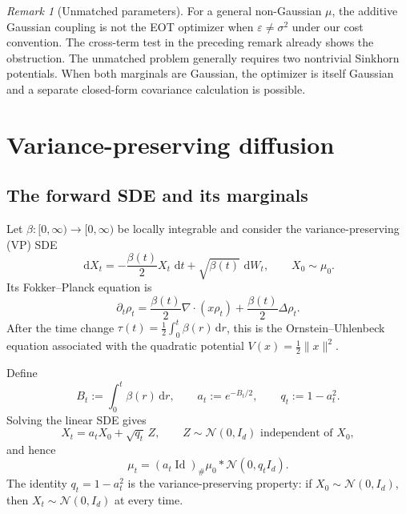 \documentclass[11pt]{article}
\theoremstyle{remark}
\newtheorem{remark}[theorem]{Remark}
\newcommand{\N}{\mathcal{N}}
\newcommand{\Id}{\operatorname{Id}}
\newcommand{\dd}{\,\mathrm{d}}
\newcommand{\push}{_{\#}}
\begin{document}
\begin{remark}[Unmatched parameters]
For a general non-Gaussian $\mu$, the additive Gaussian coupling is not the
EOT optimizer when $\varepsilon\ne\sigma^2$ under our cost convention.  The
cross-term test in the preceding remark already shows the obstruction.  The
unmatched problem generally requires two nontrivial Sinkhorn potentials.
When both marginals are Gaussian, the optimizer is itself Gaussian and a
separate closed-form covariance calculation is possible.
\end{remark}

\section{Variance-preserving diffusion}

\subsection{The forward SDE and its marginals}

Let $\beta:[0,\infty)\to[0,\infty)$ be locally integrable and consider the
variance-preserving (VP) SDE
\begin{equation}
  \label{eq:vp-sde}
  \dd X_t=-\frac{\beta(t)}2X_t\,\dd t+\sqrt{\beta(t)}\,\dd W_t,
  \qquad X_0\sim\mu_0.
\end{equation}
Its Fokker--Planck equation is
\begin{equation}
  \label{eq:fokker-planck}
  \partial_t\rho_t
  =\frac{\beta(t)}2\nabla\!\cdot(x\rho_t)
   +\frac{\beta(t)}2\Delta\rho_t.
\end{equation}
After the time change $\tau(t)=\frac12\int_0^t\beta(r)\dd r$, this is the
Ornstein--Uhlenbeck equation associated with the quadratic potential
$V(x)=\frac12\lVert x\rVert^2$.

Define
\begin{equation}
  \label{eq:at-qt}
  B_t:=\int_0^t\beta(r)\dd r,
  \qquad
  a_t:=e^{-B_t/2},
  \qquad
  q_t:=1-a_t^2.
\end{equation}
Solving the linear SDE gives
\begin{equation}
  \label{eq:vp-solution}
  X_t=a_tX_0+\sqrt{q_t}\,Z,
  \qquad Z\sim\N(0,I_d)\text{ independent of }X_0,
\end{equation}
and hence
\begin{equation}
  \label{eq:vp-marginal}
  \mu_t=(a_t\Id)\push\mu_0*\N(0,q_tI_d).
\end{equation}
The identity $q_t=1-a_t^2$ is the variance-preserving property: if
$X_0\sim\N(0,I_d)$, then $X_t\sim\N(0,I_d)$ at every time.
\end{document}
